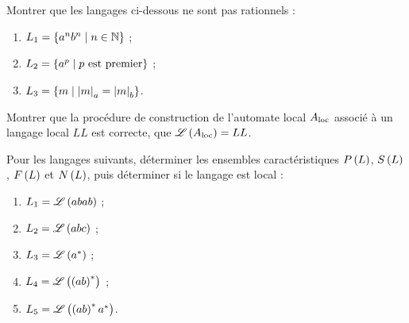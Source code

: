 \begin{corr}
\end{corr}

\begin{exo}
Montrer que les langages ci-dessous ne sont pas rationnels :

\begin{enumerate}
    \item \(L_1=\left\lbrace a^nb^n\;\middle|\; n\in\mathbb{N}\right\rbrace\) ; \\
    \item \(L_2=\left\lbrace a^p\;\middle|\; p\text{ est premier}\right\rbrace\) ; \\
    \item \(L_3=\left\lbrace m\;\middle|\;\left\lvert m\right\rvert_a=\left\lvert m\right\rvert_b\right\rbrace\).
\end{enumerate}
\end{exo}

\begin{corr}
\end{corr}

\begin{exo}
Montrer que la procédure de construction de l'automate local \(A_{\mathrm{loc}}\) associé à un langage local \(LL\) est correcte, \cad que \(\mathscr{L}\left(A_{\mathrm{loc}}\right)=LL\).
\end{exo}

\begin{corr}
\end{corr}

\begin{exo}
Pour les langages suivants, déterminer les ensembles caractéristiques \(P\left(L\right)\), \(S\left(L\right)\), \(F\left(L\right)\) et \(N\left(L\right)\), puis déterminer si le langage est local :

\begin{enumerate}
    \item \(L_1=\mathscr{L}\left(abab\right)\) ; \\
    \item \(L_2=\mathscr{L}\left(abc\right)\) ; \\
    \item \(L_3=\mathscr{L}\left(a^{*}\right)\) ; \\
    \item \(L_4=\mathscr{L}\left(\left(ab\right)^{*}\right)\) ; \\
    \item \(L_5=\mathscr{L}\left(\left(ab\right)^{*} a^{*}\right)\).
\end{enumerate}
\end{exo}

